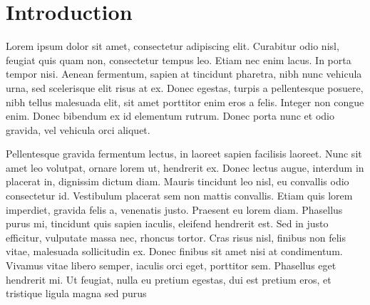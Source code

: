 \chapter*{Introduction}
\label{s:intro}

Lorem ipsum dolor sit amet, consectetur adipiscing elit. Curabitur odio nisl, feugiat quis quam non, consectetur tempus leo. Etiam nec enim lacus. In porta tempor nisi. Aenean fermentum, sapien at tincidunt pharetra, nibh nunc vehicula urna, sed scelerisque elit risus at ex. Donec egestas, turpis a pellentesque posuere, nibh tellus malesuada elit, sit amet porttitor enim eros a felis. Integer non congue enim. Donec bibendum ex id elementum rutrum. Donec porta nunc et odio gravida, vel vehicula orci aliquet.

Pellentesque gravida fermentum lectus, in laoreet sapien facilisis laoreet. Nunc sit amet leo volutpat, ornare lorem ut, hendrerit ex. Donec lectus augue, interdum in placerat in, dignissim dictum diam. Mauris tincidunt leo nisl, eu convallis odio consectetur id. Vestibulum placerat sem non mattis convallis. Etiam quis lorem imperdiet, gravida felis a, venenatis justo. Praesent eu lorem diam. Phasellus purus mi, tincidunt quis sapien iaculis, eleifend hendrerit est. Sed in justo efficitur, vulputate massa nec, rhoncus tortor. Cras risus nisl, finibus non felis vitae, malesuada sollicitudin ex. Donec finibus sit amet nisi at condimentum. Vivamus vitae libero semper, iaculis orci eget, porttitor sem. Phasellus eget hendrerit mi. Ut feugiat, nulla eu pretium egestas, dui est pretium eros, et tristique ligula magna sed purus